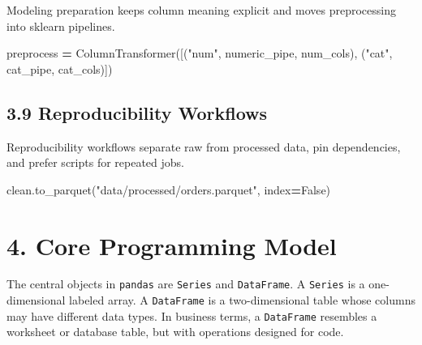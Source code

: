 \documentclass[
  12pt,
]{article}
\newenvironment{Shaded}{\begin{snugshade}}{\end{snugshade}}
\newcommand{\NormalTok}[1]{#1}
\newcommand{\OperatorTok}[1]{\textcolor[rgb]{0.81,0.36,0.00}{\textbf{#1}}}
\newcommand{\StringTok}[1]{\textcolor[rgb]{0.31,0.60,0.02}{#1}}
\newcommand{\VariableTok}[1]{\textcolor[rgb]{0.00,0.00,0.00}{#1}}
\begin{document}
Modeling preparation keeps column meaning explicit and moves
preprocessing into sklearn pipelines.

\begin{Shaded}
\begin{Highlighting}[]
\NormalTok{preprocess }\OperatorTok{=}\NormalTok{ ColumnTransformer([(}\StringTok{"num"}\NormalTok{, numeric\_pipe, num\_cols), (}\StringTok{"cat"}\NormalTok{, cat\_pipe, cat\_cols)])}
\end{Highlighting}
\end{Shaded}

\subsection{3.9 Reproducibility
Workflows}\label{reproducibility-workflows}

Reproducibility workflows separate raw from processed data, pin
dependencies, and prefer scripts for repeated jobs.

\begin{Shaded}
\begin{Highlighting}[]
\NormalTok{clean.to\_parquet(}\StringTok{"data/processed/orders.parquet"}\NormalTok{, index}\OperatorTok{=}\VariableTok{False}\NormalTok{)}
\end{Highlighting}
\end{Shaded}

\section{4. Core Programming Model}\label{core-programming-model}

The central objects in \texttt{pandas} are \texttt{Series} and
\texttt{DataFrame}. A \texttt{Series} is a one-dimensional labeled
array. A \texttt{DataFrame} is a two-dimensional table whose columns may
have different data types. In business terms, a \texttt{DataFrame}
resembles a worksheet or database table, but with operations designed
for code.
\end{document}
